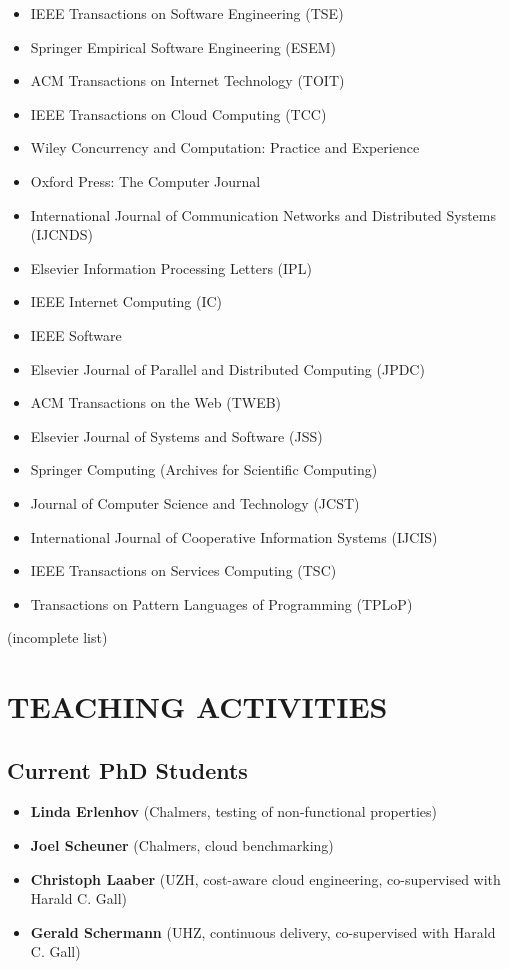 \documentclass[paper=letter,fontsize=11pt]{scrartcl} %
\newcommand{\NewPart}[2]{\section*{\uppercase{#1} #2}}
\begin{document}
\begin{itemize}
\item IEEE Transactions on Software Engineering (TSE)
\item Springer Empirical Software Engineering (ESEM)
\item ACM Transactions on Internet Technology (TOIT)
\item IEEE Transactions on Cloud Computing (TCC)
\item Wiley Concurrency and Computation: Practice and Experience
\item Oxford Press: The Computer Journal
\item International Journal of Communication Networks and Distributed Systems (IJCNDS)
\item Elsevier Information Processing Letters (IPL)
\item IEEE Internet Computing (IC)
\item IEEE Software
\item Elsevier Journal of Parallel and Distributed Computing (JPDC)
\item ACM Transactions on the Web (TWEB)
\item Elsevier Journal of Systems and Software (JSS)
\item Springer Computing (Archives for Scientific Computing)
\item Journal of Computer Science and Technology (JCST)
\item International Journal of Cooperative Information Systems (IJCIS)
\item IEEE Transactions on Services Computing (TSC)
\item Transactions on Pattern Languages of Programming (TPLoP)
\end{itemize}

(incomplete list)

\NewPart{Teaching Activities}{}

  \subsection*{Current PhD Students}

\begin{itemize}
\item \textbf{Linda Erlenhov}  (Chalmers, testing of non-functional properties)
\item \textbf{Joel Scheuner}  (Chalmers, cloud benchmarking)
\item \textbf{Christoph Laaber} (UZH, cost-aware cloud engineering, co-supervised with Harald C. Gall)
\item \textbf{Gerald Schermann} (UHZ, continuous delivery, co-supervised with Harald C. Gall)
\end{itemize}
\end{document}
